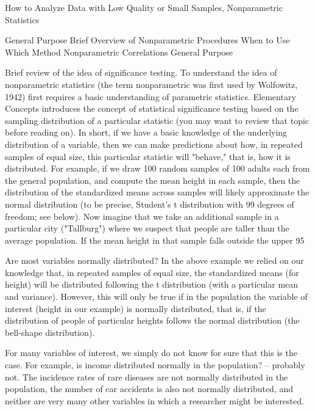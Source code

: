 How to Analyze Data with Low Quality or Small Samples, Nonparametric Statistics


General Purpose
Brief Overview of Nonparametric Procedures
When to Use Which Method
Nonparametric Correlations
General Purpose

Brief review of the idea of significance testing. To understand the idea of nonparametric statistics (the term nonparametric was first used by Wolfowitz, 1942) first requires a basic understanding of parametric statistics. Elementary Concepts introduces the concept of statistical significance testing based on the sampling distribution of a particular statistic (you may want to review that topic before reading on). In short, if we have a basic knowledge of the underlying distribution of a variable, then we can make predictions about how, in repeated samples of equal size, this particular statistic will "behave," that is, how it is distributed. For example, if we draw 100 random samples of 100 adults each from the general population, and compute the mean height in each sample, then the distribution of the standardized means across samples will likely approximate the normal distribution (to be precise, Student's t distribution with 99 degrees of freedom; see below). Now imagine that we take an additional sample in a particular city ("Tallburg") where we suspect that people are taller than the average population. If the mean height in that sample falls outside the upper 95%

Are most variables normally distributed? In the above example we relied on our knowledge that, in repeated samples of equal size, the standardized means (for height) will be distributed following the t distribution (with a particular mean and variance). However, this will only be true if in the population the variable of interest (height in our example) is normally distributed, that is, if the distribution of people of particular heights follows the normal distribution (the bell-shape distribution).



For many variables of interest, we simply do not know for sure that this is the case. For example, is income distributed normally in the population? -- probably not. The incidence rates of rare diseases are not normally distributed in the population, the number of car accidents is also not normally distributed, and neither are very many other variables in which a researcher might be interested.

